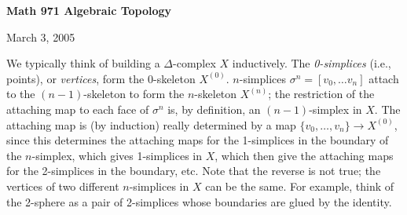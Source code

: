 \def\ccy{\Cyan}		  %
\def\cpb{\ProcessBlue}	  %
\def\csb{\SkyBlue}	  %
\def\ctu{\Turquoise}	  %
\def\ctb{\TealBlue}	  %
\def\caq{\Aquamarine}	  %
\def\cbg{\BlueGreen}	  %
\def\cem{\Emerald}	  %
\def\csg{\SeaGreen}	  %
\def\cgg{\Green}	  %
\def\cfg{\ForestGreen}	  %
\def\cpg{\PineGreen}	  %
\def\clg{\LimeGreen}	  %
\def\cyg{\YellowGreen}	  %
\def\cspg{\SpringGreen}	  %
\def\cog{\OliveGreen}	  %
\def\pars{\RawSienna}	  %
\def\cse{\Sepia}		  %
\def\cbr{\Brown}		  %
\def\cta{\Tan}		  %
\def\cgr{\Gray}		  %
\def\cbl{\Black}		  %
\def\cwh{\White}		  %


\loadmsbm



\def\ctln{\centerline}
\def\u{\underbar}
\def\ssk{\smallskip}
\def\msk{\medskip}
\def\bsk{\bigskip}
\def\hsk{\hskip.1in}
\def\hhsk{\hskip.2in}
\def\dsl{\displaystyle}
\def\hskp{\hskip1.5in}

\def\lra{$\Leftrightarrow$ }
\def\ra{\rightarrow}
\def\mpto{\logmapsto}
\def\pu{\pi_1}
\def\mpu{$\pi_1$}
\def\sig{\Sigma}
\def\msig{$\Sigma$}
\def\ep{\epsilon}
\def\sset{\subseteq}
\def\del{\partial}
\def\inv{^{-1}}
\def\wtl{\widetilde}
\def\lra{\Leftrightarrow}



\ctln{\bf Math 971 Algebraic Topology}

\ssk

\ctln{March 3, 2005}

\msk

We typically think of building a $\Delta$-complex $X$ inductively. 
The {\it 0-simplices}
(i.e., points), or {\it vertices}, form the 0-skeleton 
$X^{(0)}$. $n$-simplices $\sigma^n = [v_0,\ldots v_n]$ attach 
to the $(n-1)$-skeleton
to form the $n$-skeleton $X^{(n)}$; the restriction
of the attaching map to each face of $\sigma^n$ is, by definition,
an $(n-1)$-simplex in $X$. The attaching map is (by induction)
really determined by a map $\{v_0,\ldots ,v_n\}\ra X^{(0)}$, since this 
determines the attaching maps for the 1-simplices in the boundary of the
$n$-simplex, which 
gives 1-simplices in $X$, which then give the attaching maps for
the 2-simplices in the boundary, etc. Note that the reverse is not true;
the vertices of two different $n$-simplices in $X$ can be the same.
For example, think of the 2-sphere as a pair of 2-simplices whose 
boundaries are glued by the identity. 

